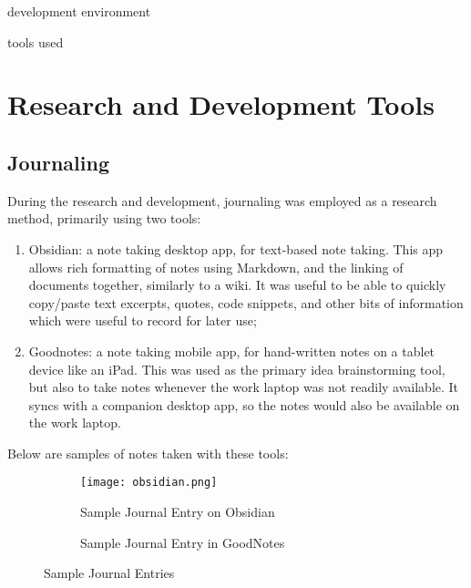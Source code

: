 \todo development environment

\todo tools used


\section{Research and Development Tools}


\subsection{Journaling}

During the research and development, journaling was employed as a research method, primarily using two tools:

\begin{enumerate}
    \item Obsidian\footnotemark[1]: a note taking desktop app, for text-based note taking. This app allows rich formatting of notes using Markdown, and the linking of documents together, similarly to a wiki. It was useful to be able to quickly copy/paste text excerpts, quotes, code snippets, and other bits of information which were useful to record for later use;
    \item Goodnotes\footnotemark[2]: a note taking mobile app, for hand-written notes on a tablet device like an iPad. This was used as the primary idea brainstorming tool, but also to take notes whenever the work laptop was not readily available. It syncs with a companion desktop app, so the notes would also be available on the work laptop.
\end{enumerate}

Below are samples of notes taken with these tools:


\begin{figure}[H]
  \centering
  \begin{subfigure}[b]{0.45\textwidth}
    \centering
    \texttt{[image: obsidian.png]}
    \caption[Sample Journal Entry on Obsidian]{Sample Journal Entry on Obsidian}
    \label{fig:obsidian}
  \end{subfigure}
  \hfill
  \begin{subfigure}[b]{0.45\textwidth}
    \centering
    \centering
    \begingroup
    \setlength{\fboxsep}{0pt} %
    \setlength{\fboxrule}{0.5pt} %
    \endgroup
    \caption[Sample Journal Entry in GoodNotes]{Sample Journal Entry in GoodNotes}
    \label{fig:goodnotes}
  \end{subfigure}
  \caption{Sample Journal Entries}
  \label{fig:sample-journal}
\end{figure}




